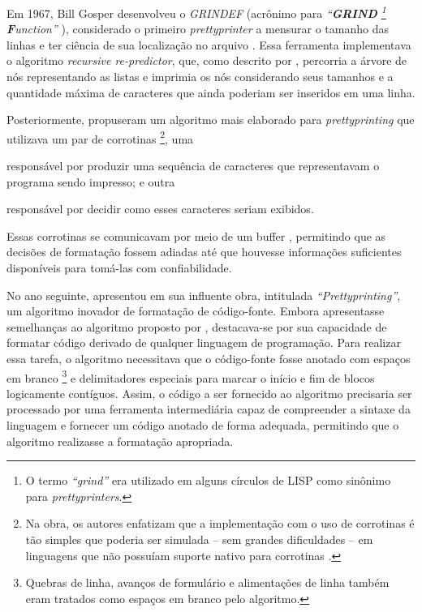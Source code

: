 \documentclass
  [11pt,a4paper,english,brazil,openright,sumario=tradicional,twoside]
  {abntex2}
\begin{document}
  Em 1967, Bill Gosper desenvolveu o \textit{GRINDEF} (acrônimo para
  \textit
    {``\textbf{GRIND}%
       \footnote
         {O termo \textit{``grind''} era utilizado em alguns círculos de LISP
          como sinônimo para \textit{prettyprinters}.}
       \textbf{F}unction''}%
  ), considerado o primeiro \textit{prettyprinter} a mensurar o tamanho das
  linhas e ter ciência de sua localização no arquivo
  \cites{gosper-2023-twubblesome}{griesemer-2022-cultural}. Essa ferramenta
  implementava o algoritmo \textit{recursive re-predictor}, que, como descrito
  por \textcite{goldstein-1973-pretty}, percorria a árvore de nós representando
  as listas e imprimia os nós considerando seus tamanhos e a quantidade máxima
  de caracteres que ainda poderiam ser inseridos em uma linha.

  Posteriormente, \textcite{hearn-1979-one} propuseram um algoritmo mais
  elaborado para \textit{prettyprinting} que utilizava um par de corrotinas%
  \footnote
    {Na obra, os autores enfatizam que a implementação com o uso de corrotinas
     é tão simples que poderia ser simulada -- sem grandes dificuldades -- em
     linguagens que não possuíam suporte nativo para corrotinas
     \cite[53]{hearn-1979-one}.},
  uma
  \begin{inparaenum}
    \item responsável por produzir uma sequência de caracteres que
          representavam o programa sendo impresso; e outra
    \item responsável por decidir como esses caracteres seriam exibidos.
  \end{inparaenum}
  Essas corrotinas se comunicavam por meio de um buffer ,
  permitindo que as decisões de formatação fossem adiadas até que houvesse
  informações suficientes disponíveis para tomá-las com confiabilidade.

  No ano seguinte, \textcite{oppen-1980-prettyprinting} apresentou em sua
  influente obra, intitulada \textit{``Prettyprinting''}, um algoritmo inovador
  de formatação de código-fonte. Embora apresentasse semelhanças ao algoritmo
  proposto por \textcite{hearn-1979-one}, destacava-se por sua capacidade de
  formatar código derivado de qualquer linguagem de programação. Para realizar
  essa tarefa, o algoritmo necessitava que o código-fonte fosse anotado com
  espaços em branco%
  \footnote
    {Quebras de linha, avanços de formulário e alimentações de linha também
     eram tratados como espaços em branco pelo algoritmo.}
  e delimitadores especiais para marcar o início e fim de blocos logicamente
  contíguos. Assim, o código a ser fornecido ao algoritmo precisaria ser
  processado por uma ferramenta intermediária capaz de compreender a sintaxe da
  linguagem e fornecer um código anotado de forma adequada, permitindo que o
  algoritmo realizasse a formatação apropriada.
\end{document}
